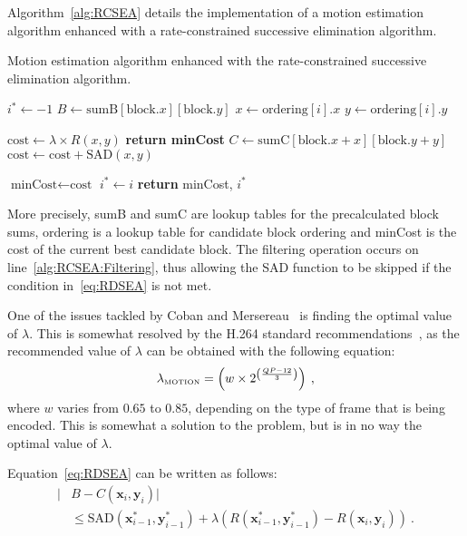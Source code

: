\documentclass{article}
\newcommand{\beq}{\begin{dmath}}
\newcommand{\eeq}{\end{dmath}}
\newcommand{\SAD}{\text{SAD}}
\newcommand{\vx}{\mathbf{x}}
\newcommand{\vy}{\mathbf{y}}
\newcommand{\LM}{\lambda_{\text{\tiny{MOTION}}}}
\begin{document}
Algorithm~\ref{alg:RCSEA} details the implementation of a motion estimation
algorithm enhanced with a rate-constrained successive elimination algorithm. 
\vspace{-0.5em}
\begin{algorithm}
\small{
\caption{Motion estimation algorithm enhanced with the rate-constrained
successive elimination algorithm.}
\label{alg:RCSEA}
\begin{algorithmic}[1]
\State $i^* \gets -1$ 
\State $B\gets \text{sumB}[\text{block}.x][\text{block}.y]$
\label{alg:RCSEA:Lookup1}
	\State $x\gets \text{ordering}[i].x$
	\State $y\gets \text{ordering}[i].y$
	
	\State $\text{cost} \gets \lambda \times R(x, y)$
		\State \textbf{return minCost}
	\EndIf
	\State $C\gets \text{sumC}[\text{block}.x + x][\text{block}.y + y]$
	\label{alg:RCSEA:Lookup2}
	\label{alg:RCSEA:Filtering}
		\State $\text{cost} \gets \text{cost} + \SAD(x,y)$
		
			\State $\text{minCost} \gets \text{cost}$
			\State $i^* \gets i$
		\EndIf
	\EndIf
\EndFor
\State \textbf{return} minCost, $i^*$
\EndFunction
\end{algorithmic}
}
\end{algorithm}
\vspace{-0.5em}
More precisely, sumB and sumC are lookup tables for the precalculated block
sums, ordering is a lookup table for candidate block ordering and minCost is the
cost of the current best candidate block. The filtering operation occurs on
line~\ref{alg:RCSEA:Filtering}, thus allowing the SAD function to be skipped if the
condition in~\eqref{eq:RDSEA} is not met.

One of the issues tackled by Coban and Mersereau~\cite{Li1995a} is finding the optimal value of
$\lambda$. This is somewhat resolved by the H.264 standard
recommendations~\cite{Lim2004}, as the recommended value of $\lambda$ can be
obtained with the following equation:
\beq
\LM = \left( w \times 2^{\left(\frac{QP - 12}{3}\right)}\right)\:, 
\eeq 
where $w$ varies from $0.65$ to $0.85$, depending on the type of frame that is
being encoded. This is somewhat a solution to the problem, but is in no way the
optimal value of $\lambda$.

Equation~\eqref{eq:RDSEA} can be written as follows:
\vspace{-0.2em}
\beq
\begin{aligned}
 | &B - C(\vx_i,\vy_i) | \\
  & \leqslant
\SAD(\vx^*_{i-1},\vy^*_{i-1}) + \lambda (R(\vx^*_{i-1},\vy^*_{i-1}) - R(\vx_i,\vy_i)) \:. 
\end{aligned}
\label{eq:InterestingForm}
\eeq
\vspace{-0.2em}
\end{document}
